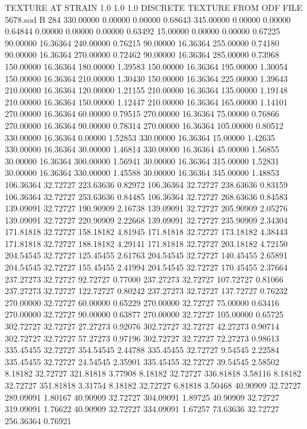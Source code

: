 TEXTURE AT STRAIN
   1.0   1.0   1.0
DISCRETE TEXTURE FROM ODF FILE  5678.sod                                
B    284
330.00000 0.00000 0.00000 0.68643
345.00000 0.00000 0.00000 0.64844
0.00000 0.00000 0.00000 0.63492
15.00000 0.00000 0.00000 0.67225
90.00000 16.36364 240.00000 0.76215
90.00000 16.36364 255.00000 0.74180
90.00000 16.36364 270.00000 0.72462
90.00000 16.36364 285.00000 0.73968
150.00000 16.36364 180.00000 1.39583
150.00000 16.36364 195.00000 1.30054
150.00000 16.36364 210.00000 1.30430
150.00000 16.36364 225.00000 1.39643
210.00000 16.36364 120.00000 1.21155
210.00000 16.36364 135.00000 1.19148
210.00000 16.36364 150.00000 1.12447
210.00000 16.36364 165.00000 1.14101
270.00000 16.36364 60.00000 0.79515
270.00000 16.36364 75.00000 0.76866
270.00000 16.36364 90.00000 0.78314
270.00000 16.36364 105.00000 0.80512
330.00000 16.36364 0.00000 1.52853
330.00000 16.36364 15.00000 1.42635
330.00000 16.36364 30.00000 1.46814
330.00000 16.36364 45.00000 1.56855
30.00000 16.36364 300.00000 1.56941
30.00000 16.36364 315.00000 1.52831
30.00000 16.36364 330.00000 1.45588
30.00000 16.36364 345.00000 1.48853
106.36364 32.72727 223.63636 0.82972
106.36364 32.72727 238.63636 0.83159
106.36364 32.72727 253.63636 0.84485
106.36364 32.72727 268.63636 0.84583
139.09091 32.72727 190.90909 2.16738
139.09091 32.72727 205.90909 2.05276
139.09091 32.72727 220.90909 2.22668
139.09091 32.72727 235.90909 2.34304
171.81818 32.72727 158.18182 4.81945
171.81818 32.72727 173.18182 4.38443
171.81818 32.72727 188.18182 4.29141
171.81818 32.72727 203.18182 4.72150
204.54545 32.72727 125.45455 2.61763
204.54545 32.72727 140.45455 2.65891
204.54545 32.72727 155.45455 2.41994
204.54545 32.72727 170.45455 2.37664
237.27273 32.72727 92.72727 0.77000
237.27273 32.72727 107.72727 0.81066
237.27273 32.72727 122.72727 0.80242
237.27273 32.72727 137.72727 0.76232
270.00000 32.72727 60.00000 0.65229
270.00000 32.72727 75.00000 0.63416
270.00000 32.72727 90.00000 0.63877
270.00000 32.72727 105.00000 0.65725
302.72727 32.72727 27.27273 0.92076
302.72727 32.72727 42.27273 0.90714
302.72727 32.72727 57.27273 0.97196
302.72727 32.72727 72.27273 0.98613
335.45455 32.72727 354.54545 2.44788
335.45455 32.72727 9.54545 2.22584
335.45455 32.72727 24.54545 2.35901
335.45455 32.72727 39.54545 2.58502
8.18182 32.72727 321.81818 3.77908
8.18182 32.72727 336.81818 3.58116
8.18182 32.72727 351.81818 3.31754
8.18182 32.72727 6.81818 3.50468
40.90909 32.72727 289.09091 1.80167
40.90909 32.72727 304.09091 1.89725
40.90909 32.72727 319.09091 1.76622
40.90909 32.72727 334.09091 1.67257
73.63636 32.72727 256.36364 0.76921
